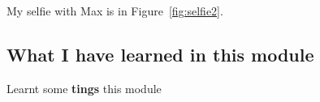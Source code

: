 
 My selfie with Max is in  Figure~\ref{fig:selfie2}.

\subsection{What I have learned in this module}
Learnt some \textbf{tings} this module
